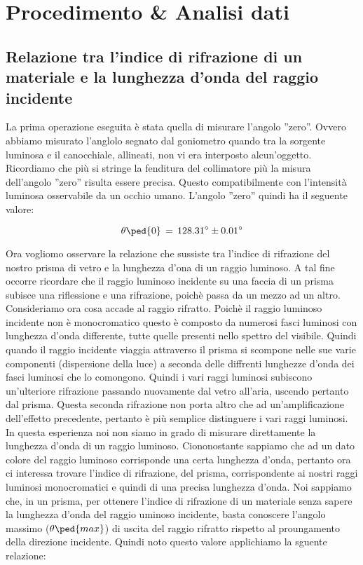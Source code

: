 \section{Procedimento \& Analisi dati}

\subsection{Relazione tra l'indice di rifrazione di un materiale e la lunghezza d'onda del raggio incidente}

La prima operazione eseguita è stata quella di misurare l'angolo ''zero''. Ovvero abbiamo misurato l'anglolo segnato dal goniometro quando tra la sorgente luminosa e il canocchiale, allineati, non vi era interposto alcun'oggetto. Ricordiamo che più si stringe la fenditura del collimatore più la misura dell'angolo ''zero'' risulta essere precisa. Questo compatibilmente con l'intensità luminosa osservabile da un occhio umano.
L'angolo ''zero'' quindi ha il seguente valore:

\begin{equation}
	\theta\ped{0} \,=\, 128.31^\circ \pm 0.01^\circ
\end{equation} 

Ora vogliomo osservare la relazione che sussiste tra l'indice di rifrazione del nostro prisma di vetro e la lunghezza d'ona di un raggio luminoso.
A tal fine occorre ricordare che il raggio luminoso incidente su una faccia di un prisma subisce una riflessione e una rifrazione, poichè passa da un mezzo ad un altro.
Consideriamo ora cosa accade al raggio rifratto. Poichè il raggio luminoso incidente non è monocromatico questo è composto da numerosi fasci luminosi con lunghezza d'onda differente, tutte quelle presenti nello spettro del visibile. Quindi quando il raggio incidente viaggia attraverso il prisma si scompone nelle sue varie componenti (dispersione della luce) a seconda delle diffrenti lunghezze d'onda dei fasci luminosi che lo comongono. Quindi i vari raggi luminosi subiscono un'ulteriore rifrazione passando nuovamente dal vetro all'aria, uscendo pertanto dal prisma. Questa seconda rifrazione non porta altro che ad un'amplificazione dell'effetto precedente, pertanto è più semplice distinguere i vari raggi luminosi.
In questa esperienza noi non siamo in grado di misurare direttamente la lunghezza d'onda di un raggio luminoso. Ciononostante sappiamo che ad un dato colore del raggio luminoso corrisponde una certa lunghezza d'onda, pertanto ora ci interessa trovare l'indice di rifrazione, del prisma, corrispondente ai nostri raggi luminosi monocromatici e quindi di una precisa lunghezza d'onda.
Noi sappiamo che, in un prisma, per ottenere l'indice di rifrazione di un materiale senza sapere la lunghezza d'onda del raggio uminoso incidente, basta conoscere l'angolo massimo ($\theta\ped{max}$) di uscita del raggio rifratto rispetto al proungamento della direzione incidente. Quindi noto questo valore applichiamo la sguente relazione:

